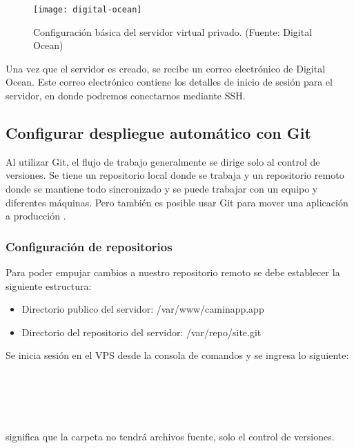 \begin{figure}[H]
  \centering
  \texttt{[image: digital-ocean]}
  \caption{Configuración básica del servidor virtual privado. (Fuente: Digital Ocean)}
  \label{digital-ocean}
\end{figure}

Una vez que el servidor es creado, se recibe un correo electrónico de Digital Ocean. Este correo electrónico contiene los detalles de inicio de sesión para el servidor, en donde podremos conectarnos mediante SSH.
\vspace{0.8cm}

\subsection{Configurar despliegue automático con Git}
Al utilizar Git, el flujo de trabajo generalmente se dirige solo al control de versiones. Se tiene un repositorio local donde se trabaja y un repositorio remoto donde se mantiene todo sincronizado y se puede trabajar con un equipo y diferentes máquinas. Pero también es posible usar Git para mover una aplicación a producción \cite{vaccaro}.
\vspace{0.8cm}

\subsubsection{Configuración de repositorios}
Para poder empujar cambios a nuestro repositorio remoto se debe establecer la siguiente estructura:

\begin{itemize}
  \item Directorio publico del servidor: /var/www/caminapp.app
  \item Directorio del repositorio del servidor: /var/repo/site.git
\end{itemize}

Se inicia sesión en el VPS desde la consola de comandos y se ingresa lo siguiente:\\
\\
\\
\\
\\
\\

 significa que la carpeta no tendrá archivos fuente, solo el control de versiones.

